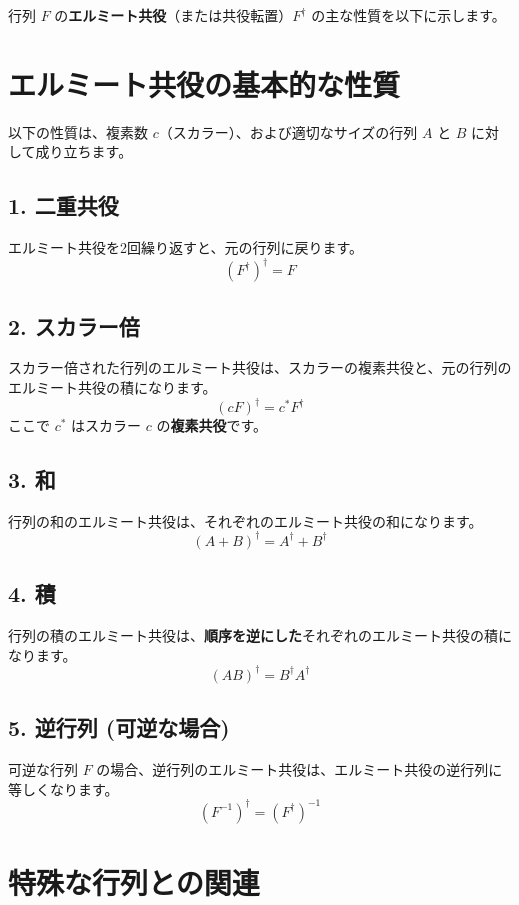 \documentclass{ltjsarticle}
\begin{document}
行列 $F$ の\textbf{エルミート共役}（または共役転置）$F^\dagger$ の主な性質を以下に示します。 \\

\section*{エルミート共役の基本的な性質}

以下の性質は、複素数 $c$（スカラー）、および適切なサイズの行列 $A$ と $B$ に対して成り立ちます。 \\

\subsection*{1. 二重共役}
エルミート共役を2回繰り返すと、元の行列に戻ります。
$$(F^\dagger)^\dagger = F$$

\subsection*{2. スカラー倍}
スカラー倍された行列のエルミート共役は、スカラーの複素共役と、元の行列のエルミート共役の積になります。
$$(c F)^\dagger = c^* F^\dagger$$
ここで $c^*$ はスカラー $c$ の\textbf{複素共役}です。

\subsection*{3. 和}
行列の和のエルミート共役は、それぞれのエルミート共役の和になります。
$$(A + B)^\dagger = A^\dagger + B^\dagger$$

\subsection*{4. 積}
行列の積のエルミート共役は、\textbf{順序を逆にした}それぞれのエルミート共役の積になります。
$$(A B)^\dagger = B^\dagger A^\dagger$$

\subsection*{5. 逆行列 (可逆な場合)}
可逆な行列 $F$ の場合、逆行列のエルミート共役は、エルミート共役の逆行列に等しくなります。
$$(F^{-1})^\dagger = (F^\dagger)^{-1}$$

\section*{特殊な行列との関連}
\end{document}
